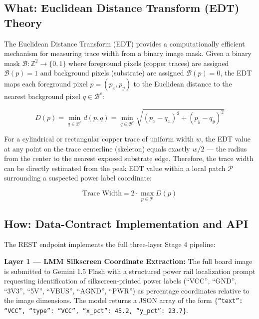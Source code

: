 \documentclass[12pt,a4paper]{report}
\begin{document}
\subsection{What: Euclidean Distance Transform (EDT) Theory}

The Euclidean Distance Transform (EDT) provides a computationally efficient mechanism for measuring trace width from a binary image mask. Given a binary mask $\mathcal{B}: \mathbb{Z}^2 \rightarrow \{0, 1\}$ where foreground pixels (copper traces) are assigned $\mathcal{B}(p) = 1$ and background pixels (substrate) are assigned $\mathcal{B}(p) = 0$, the EDT maps each foreground pixel $p = (p_x, p_y)$ to the Euclidean distance to the nearest background pixel $q \in \mathcal{B}^c$:

\begin{equation}
\label{eq:edt}
D(p) = \min_{q \in \mathcal{B}^c} d(p, q) = \min_{q \in \mathcal{B}^c} \sqrt{(p_x - q_x)^2 + (p_y - q_y)^2}
\end{equation}

For a cylindrical or rectangular copper trace of uniform width $w$, the EDT value at any point on the trace centerline (skeleton) equals exactly $w/2$ --- the radius from the center to the nearest exposed substrate edge. Therefore, the trace width can be directly estimated from the peak EDT value within a local patch $\mathcal{P}$ surrounding a suspected power label coordinate:

\begin{equation}
\label{eq:trace_width}
\text{Trace Width} = 2 \cdot \max_{p \in \mathcal{P}} D(p)
\end{equation}

\subsection{How: Data-Contract Implementation and API}
\label{subsec:stage4_api}

The  REST endpoint implements the full three-layer Stage 4 pipeline:

\textbf{Layer 1 --- LMM Silkscreen Coordinate Extraction:} The full board image is submitted to Gemini 1.5 Flash with a structured power rail localization prompt requesting identification of silkscreen-printed power labels (``VCC'', ``GND'', ``3V3'', ``5V'', ``VBUS'', ``AGND'', ``PWR'') as percentage coordinates relative to the image dimensions. The model returns a JSON array of the form $\{$\texttt{``text'': ``VCC'', ``type'': ``VCC'', ``x\_pct'': 45.2, ``y\_pct'': 23.7}$\}$.
\end{document}

